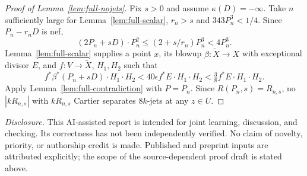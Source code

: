 \documentclass[12pt,a4paper,psamsfonts]{amsart}
\theoremstyle{definition}
\theoremstyle{plain}
\begin{document}
\begin{proof}[Proof of Lemma~\ref{lem:full-nojets}]
Fix $s>0$ and assume $\kappa(D)=-\infty$. Take $n$ sufficiently large
for Lemma~\ref{lem:full-scalar}, $r_n>s$ and $343P_n^3<1/4$.
Since $P_n-r_nD$ is nef,
\[
 (2P_n+sD)\cdot P_n^2\le(2+s/r_n)P_n^3<4P_n^3.
\]
Lemma~\ref{lem:full-scalar} supplies a point $x$, its blowup
$\beta:\widetilde X\to X$ with exceptional divisor $E$, and
$f:V\to\widetilde X$, $H_1,H_2$ such that
\[
 f^*\beta^*(P_n+sD)\cdot H_1\cdot H_2
 <40\epsilon f^*E\cdot H_1\cdot H_2
 <\tfrac38 f^*E\cdot H_1\cdot H_2.
\]
Apply Lemma~\ref{lem:full-contradiction} with $P=P_n$.
Since $R(P_n,s)=R_{n,s}$, no $|kR_{n,s}|$ with $kR_{n,s}$ Cartier
separates $8k$-jets at any $z\in U$.
\end{proof}

\noindent\textit{Disclosure.} This AI-assisted report is intended for
joint learning, discussion, and checking. Its correctness has not been
independently verified. No claim of novelty, priority, or authorship
credit is made. Published and preprint inputs are attributed explicitly;
the scope of the source-dependent proof draft is stated above.
\end{document}
